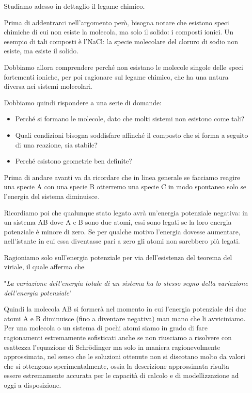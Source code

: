 
Studiamo adesso in dettaglio il legame chimico.

Prima di addentrarci nell'argomento però, bisogna notare che esistono speci chimiche di cui non esiste la molecola, ma solo il solido: i composti ionici. Un esempio di tali composti è l'NaCl: la specie molecolare del cloruro di sodio non esiste, ma esiste il solido.

Dobbiamo allora comprendere perché non esistano le molecole singole delle speci fortementi ioniche, per poi ragionare sul legame chimico, che ha una natura diversa nei sistemi molecolari.

Dobbiamo quindi rispondere a una serie di domande:
\begin{itemize}
    \item Perché si formano le molecole, dato che molti sistemi non esistono come tali?
    \item Quali condizioni bisogna soddisfare affinché il composto che si forma a seguito di una reazione, sia stabile?
    \item Perché esistono geometrie ben definite?
\end{itemize}
Prima di andare avanti va da ricordare che in linea generale se facciamo reagire una specie A con una specie B otterremo una specie C in modo spontaneo solo se l'energia del sistema diminuisce. 

Ricordiamo poi che qualunque stato legato avrà un'energia potenziale negativa: in un sistema AB dove A e B sono due atomi, essi sono legati se la loro energia potenziale è minore di zero. Se per qualche motivo l'energia dovesse aumentare, nell'istante in cui essa diventasse pari a zero gli atomi non sarebbero più legati.

Ragioniamo solo sull'energia potenziale per via dell'esistenza del teorema del viriale, il quale afferma che

"\textit{La variazione dell'energia totale di un sistema ha lo stesso segno della variazione dell'energia potenziale}"

Quindi la molecola AB si formerà nel momento in cui l'energia potenziale dei due atomi A e B diminuisce (fino a diventare negativa) man mano che li avviciniamo.\\

Per una molecola o un sistema di pochi atomi siamo in grado di fare ragionamenti estremamente sofisticati anche se non riusciamo a risolvere con esattezza l'equazione di Schrödinger ma solo in maniera ragionevolmente approssimata, nel senso che le soluzioni ottenute non si discotano molto da valori che si ottengono sperimentalmente, ossia la descrizione approssimata risulta essere estremamente accurata per le capacità di calcolo e di modellizzazione ad oggi a disposizione.

